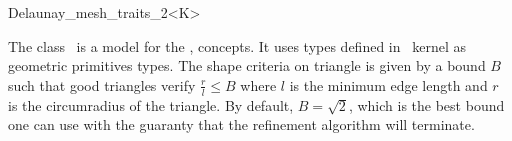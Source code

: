\begin{ccRefClass}{Delaunay_mesh_traits_2<K>}

\ccDefinition
  
The class \ccRefName\ is a model for the ,
concepts. It uses types defined in \cgal\ kernel as geometric
primitives types. The shape criteria on triangle is given by a bound
$B$ such that good triangles verify $\frac{r}{l} \le B$ where $l$ is
the minimum edge length and $r$ is the circumradius of the triangle.
By default, $B=\sqrt{2}$, which is the best bound one can use with the
guaranty that the refinement algorithm will terminate.


\ccIsModel


\ccCreation
{}
\end{ccRefClass}

